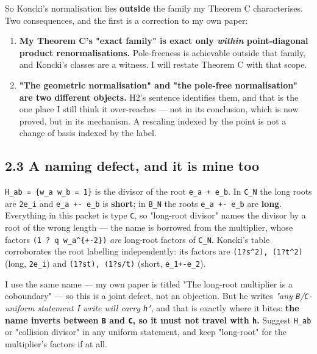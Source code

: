 \documentclass[11pt,a4paper]{article}
\begin{document}
So Koncki's normalisation lies \textbf{outside} the family my Theorem C characterises. Two consequences, and the first is a correction to my own paper:

\begin{enumerate}
\item \textbf{My Theorem C's "exact family" is exact only \emph{within} point-diagonal product renormalisations.} Pole-freeness is achievable outside that family, and Koncki's classes are a witness. I will restate Theorem C with that scope.
\item \textbf{"The geometric normalisation" and "the pole-free normalisation" are two different objects.} H2's sentence identifies them, and that is the one place I still think it over-reaches --- not in its conclusion, which is now proved, but in its mechanism. A rescaling indexed by the point is not a change of basis indexed by the label.
\end{enumerate}

\subsection*{2.3 A naming defect, and it is mine too}

\mbox{\texttt{H\_ab = \{w\_a w\_b = 1\}}} is the divisor of the root \mbox{\texttt{e\_a + e\_b}}. In \mbox{\texttt{C\_N}} the long roots are \mbox{\texttt{2e\_i}} and \mbox{\texttt{e\_a +- e\_b}} is \textbf{short}; in \mbox{\texttt{B\_N}} the roots \mbox{\texttt{e\_a +- e\_b}} are \textbf{long}. Everything in this packet is type \mbox{\texttt{C}}, so "long-root divisor" names the divisor by a root of the wrong length --- the name is borrowed from the multiplier, whose factors \mbox{\texttt{(1 ? q w\_a\textasciicircum{}\{+-2\})}} \emph{are} long-root factors of \mbox{\texttt{C\_N}}. Koncki's table corroborates the root labelling independently: its factors are \mbox{\texttt{(1?s\textasciicircum{}2), (1?t\textasciicircum{}2)}} (long, \mbox{\texttt{2e\_i}}) and \mbox{\texttt{(1?st), (1?s/t)}} (short, \mbox{\texttt{e\_1+-e\_2}}).

I use the same name --- my own paper is titled "The long-root multiplier is a coboundary" --- so this is a joint defect, not an objection. But he writes \emph{"any \mbox{\texttt{B}}/\mbox{\texttt{C}}-uniform statement I write will carry \mbox{\texttt{h}}"}, and that is exactly where it bites: \textbf{the name inverts between \mbox{\texttt{B}} and \mbox{\texttt{C}}, so it must not travel with \mbox{\texttt{h}}.} Suggest \mbox{\texttt{H\_ab}} or "collision divisor" in any uniform statement, and keep "long-root" for the multiplier's factors if at all.
\end{document}
